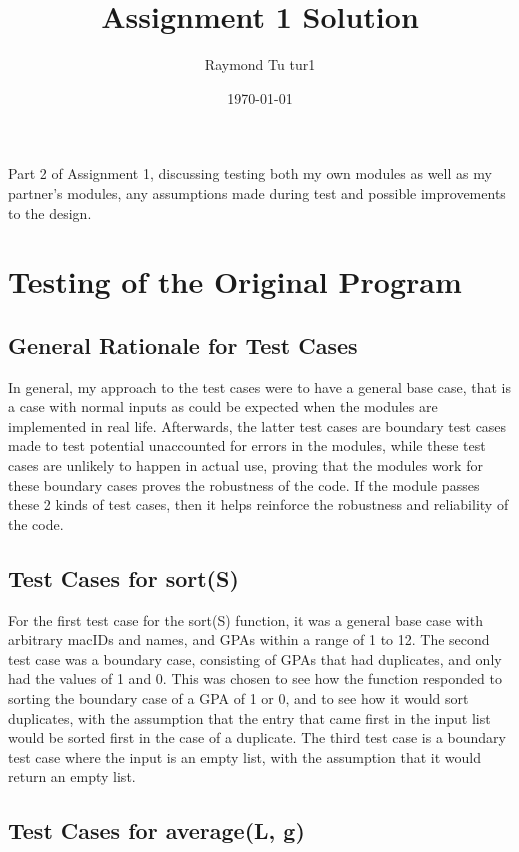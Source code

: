 \documentclass[12pt]{article}
\title{Assignment 1 Solution}
\author{Raymond Tu tur1}
\date{\today}
\begin{document}
\maketitle

Part 2 of Assignment 1, discussing testing both my own modules as well as my partner's modules, any assumptions made during test and possible improvements to the design.

\section{Testing of the Original Program}

\subsection{General Rationale for Test Cases}

In general, my approach to the test cases were to have a general base case, that is a case with normal inputs as could be expected when the modules are implemented in real life. Afterwards, the latter test cases are boundary test cases made to test potential unaccounted for errors in the modules, while these test cases are unlikely to happen in actual use, proving that the modules work for these boundary cases proves the robustness of the code. If the module passes these 2 kinds of test cases, then it helps reinforce the robustness and reliability of the code.

\subsection{Test Cases for sort(S)}

For the first test case for the sort(S) function, it was a general base case with arbitrary macIDs and names, and GPAs within a range of 1 to 12. The second test case was a boundary case, consisting of GPAs that had duplicates, and only had the values of 1 and 0. This was chosen to see how the function responded to sorting the boundary case of a GPA of 1 or 0, and to see how it would sort duplicates, with the assumption that the entry that came first in the input list would be sorted first in the case of a duplicate. The third test case is a boundary test case where the input is an empty list, with the assumption that it would return an empty list.

\subsection{Test Cases for average(L, g)}
\end{document}
